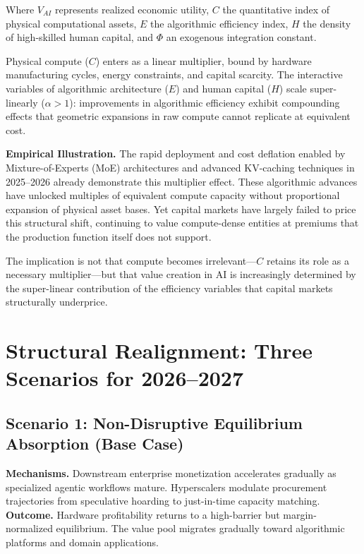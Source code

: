 \documentclass[11pt,letterpaper]{article}
\begin{document}
Where $V_{AI}$ represents realized economic utility, $C$ the quantitative index of physical computational assets, $E$ the algorithmic efficiency index, $H$ the density of high-skilled human capital, and $\Phi$ an exogenous integration constant.

Physical compute ($C$) enters as a linear multiplier, bound by hardware manufacturing cycles, energy constraints, and capital scarcity. The interactive variables of algorithmic architecture ($E$) and human capital ($H$) scale super-linearly ($\alpha > 1$): improvements in algorithmic efficiency exhibit compounding effects that geometric expansions in raw compute cannot replicate at equivalent cost.

\textbf{Empirical Illustration.} The rapid deployment and cost deflation enabled by Mixture-of-Experts (MoE) architectures and advanced KV-caching techniques in 2025--2026 already demonstrate this multiplier effect. These algorithmic advances have unlocked multiples of equivalent compute capacity without proportional expansion of physical asset bases. Yet capital markets have largely failed to price this structural shift, continuing to value compute-dense entities at premiums that the production function itself does not support.

The implication is not that compute becomes irrelevant---$C$ retains its role as a necessary multiplier---but that value creation in AI is increasingly determined by the super-linear contribution of the efficiency variables that capital markets structurally underprice.

\section{Structural Realignment: Three Scenarios for 2026--2027}

\subsection{Scenario 1: Non-Disruptive Equilibrium Absorption (Base Case)}

\textbf{Mechanisms.} Downstream enterprise monetization accelerates gradually as specialized agentic workflows mature. Hyperscalers modulate procurement trajectories from speculative hoarding to just-in-time capacity matching. \textbf{Outcome.} Hardware profitability returns to a high-barrier but margin-normalized equilibrium. The value pool migrates gradually toward algorithmic platforms and domain applications.
\end{document}
